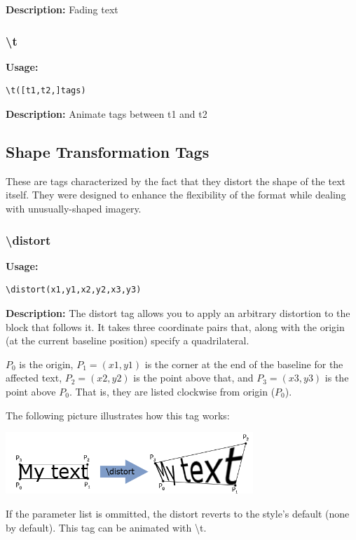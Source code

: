 \documentclass{spec}
\begin{document}
\textbf{Description:}
Fading text

\subsubsection{\textbackslash t}
\textbf{Usage:}
\begin{verbatim}
\t([t1,t2,]tags)
\end{verbatim}

\textbf{Description:}
Animate tags between t1 and t2

\subsection{Shape Transformation Tags}
These are tags characterized by the fact that they distort the shape of the text itself. They
were designed to enhance the flexibility of the format while dealing with unusually-shaped
imagery.

\subsubsection{\textbackslash distort}

\textbf{Usage:}
\begin{verbatim}
\distort(x1,y1,x2,y2,x3,y3)
\end{verbatim}

\textbf{Description:}
The distort tag allows you to apply an arbitrary distortion to the block that follows it.
It takes three coordinate pairs that, along with the origin (at the current baseline position)
specify a quadrilateral.

$P_0$ is the origin, $P_1 = (x1,y1)$ is the corner at the end of the baseline for the affected text,
$P_2 = (x2,y2)$ is the point above that, and $P_3 = (x3,y3)$ is the point above $P_0$. That is, they
are listed clockwise from origin ($P_0$).

The following picture illustrates how this tag works:\\
\begin{center}
\includegraphics[width=0.7\textwidth]{./distort}
\end{center}

If the parameter list is ommitted, the distort reverts to the style's default (none by default).
This tag can be animated with \textbackslash t.
\end{document}
